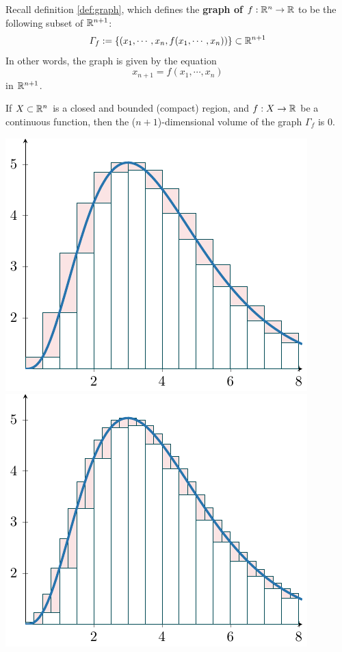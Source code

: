     \begin{example}
        Recall definition \ref{def:graph}, which defines the \textbf{graph of $f : \mathbb{R}^n \to \mathbb{R}$} to be the following subset of $\mathbb{R}^{n+1}$:        
$$\Gamma_f := \{(x_1,\cdots, x_n,f(x_1, \cdots, x_n)) \} \subset \mathbb{R}^{n+1}$$ 
In other words, the graph is given by the equation $$x_{n+1} = f(x_1, \cdots, x_n)$$ in $\mathbb{R}^{n+1}$.

\begin{theorem}\label{thm:graphvolume0}
If $X \subset \mathbb{R}^n$ is a closed and bounded (compact) region, and $f : X \to \mathbb{R}$ be a continuous function, then the ($n+1$)-dimensional volume of the graph $\Gamma_f$ is 0.
\end{theorem}

\begin{center}
    \includegraphics{chapters/4-IntegrationRn/figures/figures-integraloscillation.pdf}
    \includegraphics{chapters/4-IntegrationRn/figures/figures-integraloscillation2.pdf}
\end{center}

    \end{example}


